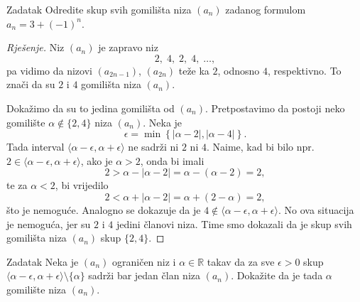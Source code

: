\begin{exercise}{Zadatak}
\label{limitpoints1}
Odredite skup svih gomilišta niza \((a_n)\) zadanog formulom \(a_n=3+(-1)^n\).
\end{exercise}
\begin{proof}[Rješenje]
Niz \((a_n)\) je zapravo niz \[2,\; 4, \; 2,\; 4,\;\dots,\] pa vidimo da nizovi \((a_{2n-1})\), \((a_{2n})\) teže ka \(2\), odnosno \(4\), respektivno. To znači da su \(2\) i \(4\) gomilišta niza \((a_n)\). 

Dokažimo da su to jedina gomilišta od \((a_n)\). Pretpostavimo da postoji neko gomilište \(\alpha\notin \{2, 4\}\) niza \((a_n)\). Neka je \[\epsilon=\min\left\{|\alpha-2|,|\alpha-4|\right\}.\] Tada interval \(\langle\alpha-\epsilon, \alpha+\epsilon\rangle\) ne sadrži ni \(2\) ni \(4\). Naime, kad bi bilo npr. \(2\in \langle\alpha-\epsilon, \alpha+\epsilon\rangle\), ako je \(\alpha>2\), onda bi imali \[2>\alpha-|\alpha-2|=\alpha-(\alpha-2)=2,\] te za \(\alpha<2\), bi vrijedilo \[2<\alpha+|\alpha-2|=\alpha+(2-\alpha)=2,\] 
što je nemoguće. Analogno se dokazuje da je \(4\notin\langle\alpha-\epsilon, \alpha+\epsilon\rangle\). 
No ova situacija je nemoguća, jer su \(2\) i \(4\) jedini članovi niza. Time smo dokazali da je skup svih gomilišta niza \((a_n)\) skup \(\{2, 4\}\).
\end{proof}
\begin{exercise}{Zadatak}
\label{limitpoints3}
Neka je \((a_n)\) ograničen niz i \(\alpha\in \mathbb{R}\) takav da za sve \(\epsilon>0\) skup \(\langle \alpha-\epsilon, \alpha+\epsilon\rangle\setminus \{\alpha\}\) sadrži bar jedan član niza \((a_n)\). Dokažite da je tada \(\alpha\) gomilište niza \((a_n)\).
\end{exercise}
